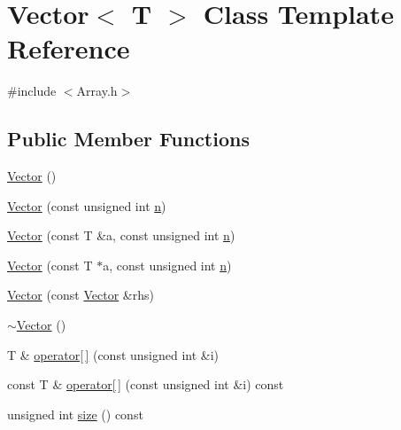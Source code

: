 \hypertarget{classVector}{}\section{Vector$<$ T $>$ Class Template Reference}
\label{classVector}


{\ttfamily \#include $<$Array.\+h$>$}

\subsection*{Public Member Functions}
\begin{DoxyCompactItemize}
\item 
\mbox{\hyperlink{classVector_a39d6069675db4ecfc1ab81d440da759a_a39d6069675db4ecfc1ab81d440da759a}{Vector}} ()
\item 
\mbox{\hyperlink{classVector_a8575836acd6e8c9a2297b5ba6d14008c_a8575836acd6e8c9a2297b5ba6d14008c}{Vector}} (const unsigned int \mbox{\hyperlink{classVector_adab11fd27ce9e960aa8612937e453786_adab11fd27ce9e960aa8612937e453786}{n}})
\item 
\mbox{\hyperlink{classVector_aa2bc8aac00503574bac8302652ef7ba0_aa2bc8aac00503574bac8302652ef7ba0}{Vector}} (const T \&a, const unsigned int \mbox{\hyperlink{classVector_adab11fd27ce9e960aa8612937e453786_adab11fd27ce9e960aa8612937e453786}{n}})
\item 
\mbox{\hyperlink{classVector_a62f06e9931e61437a5a5783eca0a9550_a62f06e9931e61437a5a5783eca0a9550}{Vector}} (const T $\ast$a, const unsigned int \mbox{\hyperlink{classVector_adab11fd27ce9e960aa8612937e453786_adab11fd27ce9e960aa8612937e453786}{n}})
\item 
\mbox{\hyperlink{classVector_ac71d98c4ac152523a76bbadcd3a83a5a_ac71d98c4ac152523a76bbadcd3a83a5a}{Vector}} (const \mbox{\hyperlink{classVector}{Vector}} \&rhs)
\item 
\mbox{\hyperlink{classVector_afd524fac19e6d3d69db5198ffe2952b0_afd524fac19e6d3d69db5198ffe2952b0}{$\sim$\+Vector}} ()
\item 
T \& \mbox{\hyperlink{classVector_aa07a0c8ca467e2ce190afc26054cf422_aa07a0c8ca467e2ce190afc26054cf422}{operator\mbox{[}$\,$\mbox{]}}} (const unsigned int \&i)
\item 
const T \& \mbox{\hyperlink{classVector_a36cc881f0270de628bec7a80bbdab741_a36cc881f0270de628bec7a80bbdab741}{operator\mbox{[}$\,$\mbox{]}}} (const unsigned int \&i) const
\item 
unsigned int \mbox{\hyperlink{classVector_a5214a382564aedc712b609416aa3b7b1_a5214a382564aedc712b609416aa3b7b1}{size}} () const

\end{DoxyCompactItemize}
